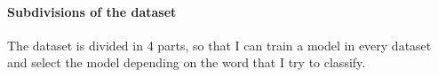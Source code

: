 \paragraph{Subdivisions of the dataset}
The dataset is divided in 4 parts, so that I can train a model in every dataset and select the model depending on the word that I try to classify.
\begin{table}[h]
    \centering
\caption{Subdivisions of the dataset}
\label{table:introduction_dataset_subdivisions}
\end{table}

